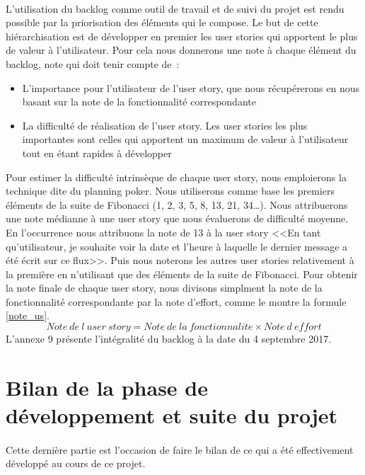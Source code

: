 			\paragraph{}%
			L'utilisation du backlog comme outil de travail et de suivi du projet est
			rendu possible par la priorisation des éléments qui le compose. Le but de
			cette hiérarchisation est de développer en premier les user stories qui
			apportent le plus de valeur à l'utilisateur. Pour cela nous donnerons
			une note à chaque élément du backlog, note qui doit tenir compte de~:
			\begin{itemize}
			  \item L'importance pour l'utilisateur de l'user story, que nous
			  récupérerons en nous basant sur la note de la fonctionnalité correspondante
			  \item La difficulté de réalisation de l'user story. Les user stories les
			  plus importantes sont celles qui apportent un maximum de valeur à
			  l'utilisateur tout en étant rapides à développer
			\end{itemize}
			Pour estimer la difficulté intrinsèque de chaque user story,
			nous emploierons la technique dite du planning poker. Nous utiliserons comme
			base les premiers éléments de la suite de Fibonacci (1, 2, 3, 5, 8, 13, 21,
			34\ldots). Nous attribuerons une note médianne à une user story que nous
			évaluerons de difficulté moyenne. En l'occurrence nous attribuons la note de
			13 à la user story <<En tant qu'utilisateur, je souhaite voir la date et
			l'heure à laquelle le dernier message a été écrit sur ce flux>>. 
			Puis nous noterons les autres user stories relativement à la première en
			n'utilisant que des éléments de la suite de Fibonacci.\newline
			Pour obtenir la note finale de chaque user story, nous divisons simplment la
			note de la fonctionnalité correspondante par la note d'effort, comme le
			montre la formule \ref{note_us}.
			\begin{equation}
				\label{note_us}
				Note\ de\ l\ user\ story=Note\ de\ la\ fonctionnalite \times Note\ d\ effort
			\end{equation}
			L'annexe 9 présente l'intégralité du backlog à la date du 4 septembre 2017.
	
	\section{Bilan de la phase de développement et suite du projet}
		\paragraph{}
		Cette dernière partie est l'occasion de faire le bilan de ce qui a été
		effectivement développé au cours de ce projet.
		
